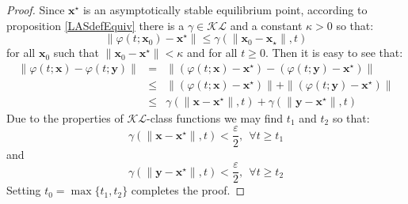 \documentclass[a4paper,10pt,oneside]{book}
\begin{document}
\begin{proof}
 Since $\mathbf{x}^\star$ is an asymptotically stable equilibrium point, according to proposition \ref{LASdefEquiv} there is a $\gamma\in\mathcal{KL}$ and a constant $\kappa>0$ so that:
\begin{equation}
 \|\varphi(t;\mathbf{x}_0)-\mathbf{x}^\star\|\leq \gamma(\|\mathbf{x}_0-\mathbf{x}_\star\|,t)
\end{equation}
for all $\mathbf{x}_0$ such that $\|\mathbf{x}_0-\mathbf{x}^\star\|<\kappa$ and for all $t\geq 0$. Then it is easy to see that:
\begin{eqnarray}
 \| \varphi(t;\mathbf{x}) -\varphi(t;\mathbf{y}) \| &=&\| (\varphi(t;\mathbf{x}) - \mathbf{x}^\star) - (\varphi(t;\mathbf{y}) - \mathbf{x}^\star  )\|\\
&\leq& \| (\varphi(t;\mathbf{x}) - \mathbf{x}^\star)\| + \|(\varphi(t;\mathbf{y}) - \mathbf{x}^\star  )\|\\
&\leq& \gamma(\|\mathbf{x}-\mathbf{x}^\star\| ,t) + \gamma(\|\mathbf{y}-\mathbf{x}^\star\| ,t)
\end{eqnarray}
Due to the properties of $\mathcal{KL}$-class functions we may find $t_1$ and $t_2$ so that:
\begin{equation}
 \gamma(\|\mathbf{x}-\mathbf{x}^\star\| ,t) < \frac{\varepsilon}{2},\ \  \forall t\geq t_1
\end{equation}
and
\begin{equation}
 \gamma(\|\mathbf{y}-\mathbf{x}^\star\| ,t) < \frac{\varepsilon}{2},\ \  \forall t\geq t_2
\end{equation}
Setting $t_0=\max\{t_1,t_2\}$ completes the proof.
\end{proof}
%
%
%
%
%
%
\end{document}
